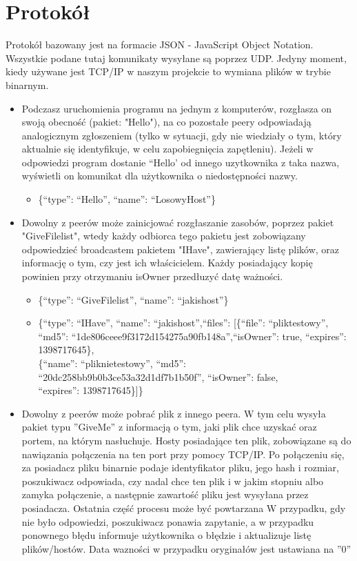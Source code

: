 \documentclass[10pt,a4paper]{article}
\begin{document}
\section{Protokół}
Protokół bazowany jest na formacie JSON - JavaScript Object Notation.
Wszystkie podane tutaj komunikaty wysyłane są poprzez UDP. Jedyny moment,
kiedy używane jest TCP/IP w naszym projekcie to wymiana plików w trybie
binarnym.

\begin{itemize}
\item Podczasz uruchomienia programu na jednym z komputerów, rozgłasza on swoją obecność (pakiet: "Hello"), na co pozostałe peery odpowiadają analogicznym zgłoszeniem (tylko w sytuacji, gdy nie wiedziały o tym, który aktualnie się identyfikuje, w celu zapobiegnięcia zapętleniu). Jeżeli w odpowiedzi program dostanie “Hello’ od innego uzytkownika z taka nazwa, wyświetli on komunikat dla użytkownika o niedostępności nazwy.
\renewcommand{\labelitemii}{$\circ$}
\begin{itemize}
\item \{“type”: “Hello”, “name”: “LosowyHost”\}
\end{itemize}
\item Dowolny z peerów może zainicjować rozgłaszanie zasobów, poprzez pakiet "GiveFilelist", wtedy każdy odbiorca tego pakietu jest zobowiązany odpowiedzieć broadcastem pakietem "IHave", zawierający listę plików, oraz informację o tym, czy jest ich właścicielem. Każdy posiadający kopię powinien przy otrzymaniu isOwner przedłuzyć datę ważności.
\begin{itemize}
\item \{“type”: “GiveFilelist”, “name”: “jakishost”\}
\item \{“type”: “IHave”, “name”: “jakishost”,“files”: [\{“file”: “pliktestowy”,
\\“md5”: “1de806ceee9f3172d154275a90fb148a”,“isOwner”: true, “expires”: 1398717645\},
\\\{“name”: “pliknietestowy”, “md5”: “20dc258bb9b0b3ce53a32d1df7b1b50f”, “isOwner”: false,
\\“expires”: 1398717645\}]\}
\end{itemize}
\item Dowolny z peerów może pobrać plik z innego peera. W tym celu wysyła pakiet typu ''GiveMe'' z informacją o tym, jaki plik chce uzyskać oraz portem, na którym nasłuchuje. Hosty posiadające ten plik, zobowiązane są do nawiązania połączenia na ten port przy pomocy TCP/IP. Po połączeniu się, za posiadacz pliku binarnie podaje identyfikator pliku, jego hash i rozmiar, poszukiwacz odpowiada, czy nadal chce ten plik i w jakim stopniu albo zamyka połączenie, a następnie zawartość pliku jest wysyłana przez posiadacza. Ostatnia część procesu może być powtarzana W przypadku, gdy nie było odpowiedzi, poszukiwacz ponawia zapytanie, a w przypadku ponownego błędu informuje użytkownika o błędzie i aktualizuje listę plików/hostów. Data wazności w przypadku oryginałów jest ustawiana na ''0''

\end{itemize}
\end{document}
